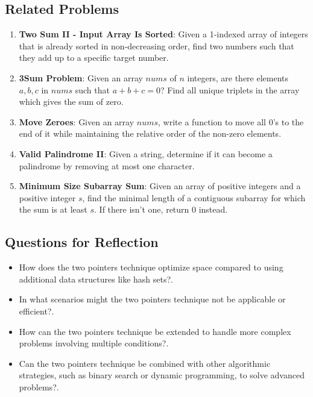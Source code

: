 \subsection*{Related Problems}
\begin{enumerate}
    \item \textbf{Two Sum II - Input Array Is Sorted}: Given a 1-indexed array of integers that is already sorted in non-decreasing order, find two numbers such that they add up to a specific target number.
    
    \item \textbf{3Sum Problem}: Given an array \(nums\) of \(n\) integers, are there elements \(a, b, c\) in \(nums\) such that \(a + b + c = 0\)? Find all unique triplets in the array which gives the sum of zero.
    
    \item \textbf{Move Zeroes}: Given an array \(nums\), write a function to move all 0's to the end of it while maintaining the relative order of the non-zero elements.
    
    \item \textbf{Valid Palindrome II}: Given a string, determine if it can become a palindrome by removing at most one character.
    
    \item \textbf{Minimum Size Subarray Sum}: Given an array of positive integers and a positive integer \(s\), find the minimal length of a contiguous subarray for which the sum is at least \(s\). If there isn't one, return 0 instead.
\end{enumerate}

\subsection*{Questions for Reflection}
\begin{itemize}
    \item How does the two pointers technique optimize space compared to using additional data structures like hash sets?.
    \item In what scenarios might the two pointers technique not be applicable or efficient?.
    \item How can the two pointers technique be extended to handle more complex problems involving multiple conditions?.
    \item Can the two pointers technique be combined with other algorithmic strategies, such as binary search or dynamic programming, to solve advanced problems?.
\end{itemize}

